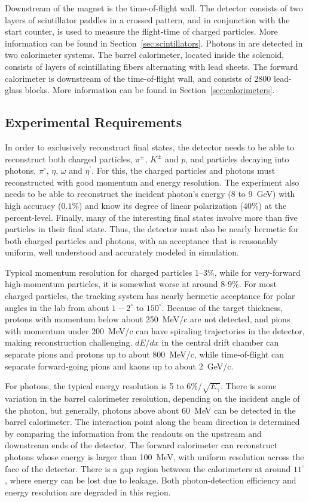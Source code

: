 Downstream of the magnet is the time-of-flight wall. The detector consists of two layers of scintillator paddles in a crossed pattern, and in conjunction with the start counter, is used to measure the flight-time of charged particles. More information can be found in Section~\ref{sec:scintillators}. 
Photons in \gx{} are detected in two calorimeter systems. The barrel calorimeter, located inside the solenoid, consists of layers of scintillating fibers alternating with lead sheets. The forward calorimeter is downstream of the time-of-flight wall, and consists of $2800$ lead-glass blocks. More information can be found in Section~\ref{sec:calorimeters}.

\subsection[Experimental Requirements]{Experimental Requirements \label{sec:intro:requirements}}
In order to exclusively reconstruct final states, the \gx{} detector needs to be able to reconstruct both charged particles, $\pi^{\pm}$, $K^{\pm}$ and $p$, and particles decaying into photons, $\pi^{\circ}$, $\eta$, $\omega$ and $\eta^{\prime}$. For this, the charged particles and photons must reconstructed with good momentum and energy resolution. The experiment also needs to be able to reconstruct the incident photon's energy (8 to 9~GeV) with high accuracy ($0.1$\%) and know its degree of linear polarization (40\%) at the percent-level. Finally, many of the interesting final states involve more than five particles in their final state. Thus, the \gx{} detector must also be nearly hermetic for both charged particles and photons, with an acceptance that is reasonably uniform, well understood and accurately modeled in simulation.

Typical momentum resolution for charged particles $1$--$3\%$, while for very-forward high-momentum particles, it is somewhat worse at around $8$-$9\%$. For most charged particles, the tracking system has nearly hermetic acceptance for polar angles in the lab from about $1-2^{\circ}$ to $150^{\circ}$. Because of the target thickness, protons with momentum below about 250~MeV/c are not detected, and pions with momentum under 200~MeV/c can have spiraling trajectories in the detector, making reconstruction challenging. $dE/dx$ in the central drift chamber can separate pions and protons up to about 800~MeV/c, while time-of-flight can separate forward-going pions and kaons up to about 2~GeV/c.

For photons, the typical energy resolution is 5 to 6\%$/\sqrt{E_{\gamma}}$. There is some variation in the barrel calorimeter resolution, depending on the incident angle of the photon, but generally, photons above about 60~MeV can be detected in the barrel calorimeter. The interaction point along the beam direction is determined by comparing the information from the readouts on the upstream and downstream ends of the detector. The forward calorimeter can reconstruct photons whose energy is larger than 100~MeV, with uniform resolution across the face of the detector. There is a gap region between the calorimeters at around $11^{\circ}$, where energy can be lost due to leakage. Both photon-detection efficiency and energy resolution are degraded in this region. 
 
